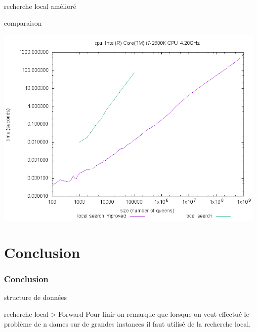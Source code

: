 \documentclass[10pt,a4paper]{beamer}
\begin{document}
\begin{frame}
\begin{block}{recherche local amélioré}
	\end{block}
	
	\begin{block}{comparaison}
	
	\includegraphics[width=1\textwidth]{images/plot_lst_ls_i7.png}
	
	\end{block}
	
	

\end{frame}

\section{Conclusion}
\begin{frame}
	\frametitle{Conclusion}
	
	\begin{block}{structure de données}
		
		
	\end{block}
	
	\begin{block}{recherche local > Forward}
		Pour finir on remarque que lorsque on veut effectué le problème de n dames sur de grandes instances il faut utilisé de la recherche local.
	\end{block}
	
	
\end{frame}
\end{document}
